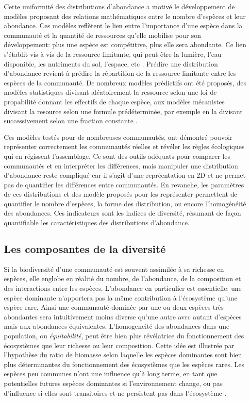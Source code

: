 \documentclass[
  11pt,
  french,
  A4paper,
  extrafontsizes,onecolumn,openright
  ]{memoir}
\begin{document}
Cette uniformité des distributions d'abondance a motivé le développement
de modèles proposant des relations mathématiques entre le nombre
d'espèces et leur abondance. Ces modèles reflètent le lien entre
l'importance d'une espèce dans la communauté et la quantité de
ressources qu'elle mobilise pour son développement: plus une espèce est
compétitive, plus elle sera abondante. Ce lien s'établit vis à vis de la
ressource limitante, qui peut être la lumière, l'eau disponible, les
nutriments du sol, l'espace, etc
\autocites{Silvertown2004}{terSteege2006}. Prédire une distribution
d'abondance revient à prédire la répartition de la ressource limitante
entre les espèces de la communauté. De nombreux modèles prédictifs ont
été proposés, des modèles statistiques divisant aléatoirement la
ressource selon une loi de propabilité donnant les effectifs de chaque
espèce, aux modèles mécanistes divisant la resource selon une formule
prédéterminée, par exemple en la divisant successivement selon une
fraction constante
\autocites{Fisher1943}{Motomura1932}{Tokeshi1993}{Magurran1988}.

Ces modèles testés pour de nombreuses communautés, ont démontré pouvoir
représenter correctement les communautés réelles et révéler les règles
écologiques qui en régissent l'assemblage. Ce sont des outils adéquats
pour comparer les communautés et en interpréter les différences, mais
manipuler une distribution d'abondance reste compliqué car il s'agit
d'une repréentation en 2D et ne permet pas de quantifier les différences
entre communautés. En revanche, les paramètres de ces distributions et
des modèle proposés pour les représenter permettent de quantifier le
nombre d'espèces, la forme des distribution, ou encore l'homogénéité des
abondances. Ces indicateurs sont les indices de diversité, résumant de
façon quantifiable les caractéristiques des distributions d'abondance.

\subsection{Les composantes de la
diversité}\label{les-composantes-de-la-diversite}

Si la biodiversité d'une communauté est souvent assimilée à sa richesse
en espèces, elle englobe en réalité du nombre, de l'abondance, de la
composition et des interactions entre les espèces. L'abondance en
particulier est essentielle: une espèce dominante n'apportera pas la
même contribution à l'écosystème qu'une espèce rare. Ainsi une
communauté dominée par une ou deux espèces très abondantes sera
intuitivement moins diverse qu'une autre avec autant d'espèces mais aux
abondances équivalentes. L'homogeneité des abondances dans une
population, ou \emph{équitabilité}, peut être bien plus révélatrice du
fonctionnement des écosystèmes que leur richesse ou leur composition.
Cette idée est illustrée par l'hypothèse du ratio de biomasse selon
laquelle les espèces dominantes sont bien plus déterminantes du
fonctionnement des écosystèmes que les espèces rares. Les espèces peu
communes n'ont une influence qu'à long terme, en tant que potentielles
futures espèces dominantes si l'environnement change, ou pas d'influence
si elles sont transitoires et ne persistent pas dans l'écosystème
\autocite{Grime1998}.
\end{document}
